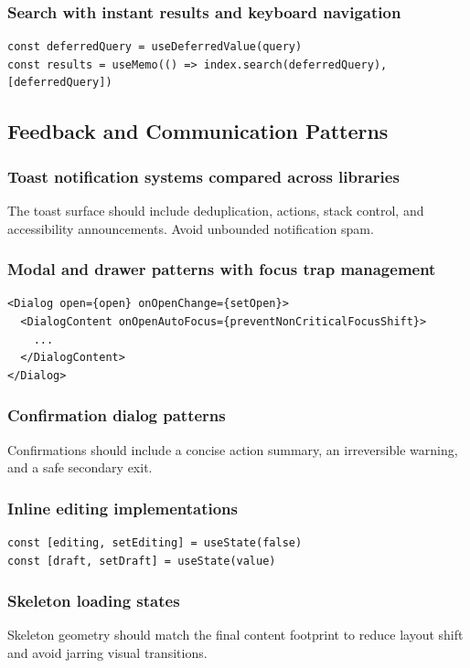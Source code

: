 \subsubsection{Search with instant results and keyboard navigation}
\begin{verbatim}
const deferredQuery = useDeferredValue(query)
const results = useMemo(() => index.search(deferredQuery), [deferredQuery])
\end{verbatim}

\subsection{Feedback and Communication Patterns}

\subsubsection{Toast notification systems compared across libraries}
The toast surface should include deduplication, actions, stack control, and accessibility announcements. Avoid unbounded notification spam.

\subsubsection{Modal and drawer patterns with focus trap management}
\begin{verbatim}
<Dialog open={open} onOpenChange={setOpen}>
  <DialogContent onOpenAutoFocus={preventNonCriticalFocusShift}>
    ...
  </DialogContent>
</Dialog>
\end{verbatim}

\subsubsection{Confirmation dialog patterns}
Confirmations should include a concise action summary, an irreversible warning, and a safe secondary exit.

\subsubsection{Inline editing implementations}
\begin{verbatim}
const [editing, setEditing] = useState(false)
const [draft, setDraft] = useState(value)
\end{verbatim}

\subsubsection{Skeleton loading states}
Skeleton geometry should match the final content footprint to reduce layout shift and avoid jarring visual transitions.

